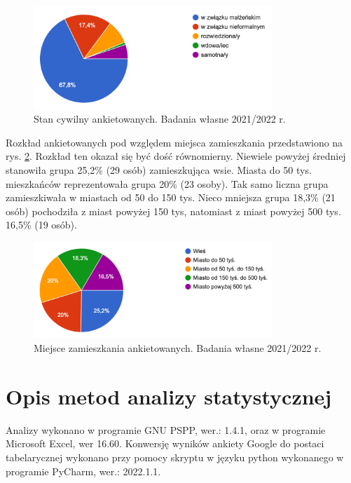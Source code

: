 \documentclass[a4paper,12pt,twoside,openright]{mwrep}
\begin{document}
\begin{figure}[H]
\centering
\includegraphics[width=9cm]{char_gr_bad/cyw00}
\caption{Stan cywilny ankietowanych. Badania własne 2021/2022 r.}
\label{rys:cywil}
\end{figure}


Rozkład ankietowanych pod względem miejsca zamieszkania przedstawiono na rys. \ref{rys:zamiesz}. Rozkład ten okazał się być dość równomierny. Niewiele powyżej średniej stanowiła grupa 25,2\% (29 osób) zamieszkująca  wsie. Miasta do 50 tys. mieszkańców reprezentowała grupa  20\%  (23 osoby). Tak samo liczna grupa zamieszkiwała w miastach od 50 do 150 tys. Nieco mniejsza grupa  18,3\% (21 osób) pochodziła z miast powyżej 150 tys, natomiast z miast powyżej 500 tys.  16,5\% (19 osób).
\begin{figure}[H]
\centering
\includegraphics[width=9cm]{char_gr_bad/zamieszka00}
\caption{Miejsce zamieszkania ankietowanych. Badania własne 2021/2022 r.}
\label{rys:zamiesz}
\end{figure}

\section{Opis metod analizy statystycznej}

Analizy wykonano w programie GNU PSPP, wer.: 1.4.1, oraz w programie Microsoft Excel, wer 16.60. Konwersję wyników ankiety Google do postaci tabelarycznej wykonano przy pomocy skryptu w języku python wykonanego w programie PyCharm, wer.: 2022.1.1.

\vspace{\baselineskip} 
\end{document}
